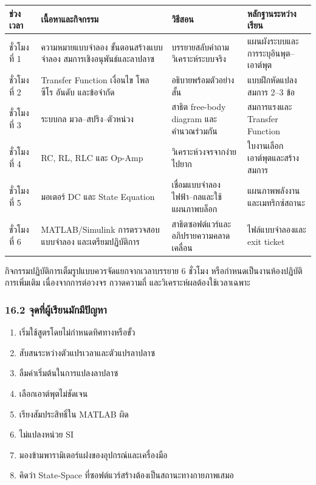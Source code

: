 \begin{table}[htbp]
    \centering
    \begin{tabular}{l l l l}
        \hline
        \textbf{ช่วงเวลา} & \textbf{เนื้อหาและกิจกรรม} & \textbf{วิธีสอน} & \textbf{หลักฐานระหว่างเรียน} \\
        \hline
        ชั่วโมงที่ 1 & ความหมายแบบจำลอง ขั้นตอนสร้างแบบจำลอง สมการเชิงอนุพันธ์และลาปลาซ & บรรยายสลับคำถาม วิเคราะห์ระบบจริง & แผนผังระบบและการระบุอินพุต–เอาต์พุต \\
        ชั่วโมงที่ 2 & Transfer Function เงื่อนไข โพล ซีโร อันดับ และข้อจำกัด & อธิบายพร้อมตัวอย่างสั้น & แบบฝึกหัดแปลงสมการ 2–3 ข้อ \\
        ชั่วโมงที่ 3 & ระบบกล มวล–สปริง–ตัวหน่วง & สาธิต free-body diagram และคำนวณร่วมกัน & สมการแรงและ Transfer Function \\
        ชั่วโมงที่ 4 & RC, RL, RLC และ Op-Amp & วิเคราะห์วงจรจากง่ายไปยาก & ใบงานเลือกเอาต์พุตและสร้างสมการ \\
        ชั่วโมงที่ 5 & มอเตอร์ DC และ State Equation & เชื่อมแบบจำลองไฟฟ้า–กลและใช้แผนภาพบล็อก & แผนภาพพลังงานและเมทริกซ์สถานะ \\
        ชั่วโมงที่ 6 & MATLAB/Simulink การตรวจสอบแบบจำลอง และเตรียมปฏิบัติการ & สาธิตซอฟต์แวร์และอภิปรายความคลาดเคลื่อน & ไฟล์แบบจำลองและ exit ticket \\
        \hline
    \end{tabular}
\end{table}

กิจกรรมปฏิบัติการเต็มรูปแบบควรจัดแยกจากเวลาบรรยาย 6 ชั่วโมง หรือกำหนดเป็นงานห้องปฏิบัติการเพิ่มเติม เนื่องจากการต่อวงจร กวาดความถี่ และวิเคราะห์ผลต้องใช้เวลาเฉพาะ

\subsubsection{16.2 จุดที่ผู้เรียนมักมีปัญหา}

\begin{enumerate}
    \item เริ่มใช้สูตรโดยไม่กำหนดทิศทางหรือขั้ว
    \item สับสนระหว่างตัวแปรเวลาและตัวแปรลาปลาซ
    \item ลืมค่าเริ่มต้นในการแปลงลาปลาซ
    \item เลือกเอาต์พุตไม่ชัดเจน
    \item เรียงสัมประสิทธิ์ใน MATLAB ผิด
    \item ไม่แปลงหน่วย SI
    \item มองข้ามพารามิเตอร์แฝงของอุปกรณ์และเครื่องมือ
    \item คิดว่า State-Space ที่ซอฟต์แวร์สร้างต้องเป็นสถานะทางกายภาพเสมอ
\end{enumerate}

